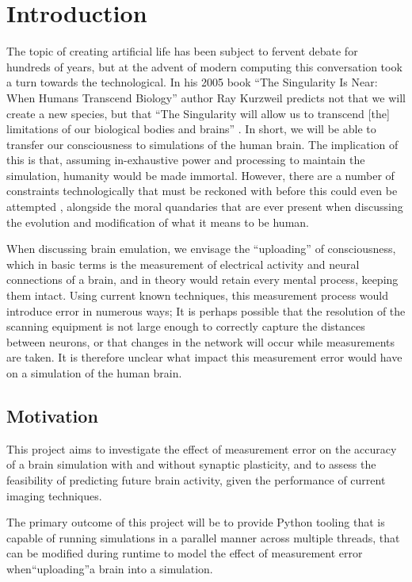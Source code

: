 \chapter{Introduction}

The topic of creating artificial life has been subject to fervent debate for
hundreds of years, but at the advent of modern computing this conversation took
a turn towards the technological. In his 2005 book “The Singularity Is Near:
When Humans Transcend Biology” author Ray Kurzweil predicts not that we will
create a new species, but that “The Singularity will allow us to transcend [the]
limitations of our biological bodies and brains”
\parencite{kurzweil_singularity_2006}.
In short, we will be able to transfer our
consciousness to simulations of the human brain. The implication of this is
that, assuming in-exhaustive power and processing to maintain the simulation,
humanity would be made immortal. However, there are a number of constraints
technologically that must be reckoned with before this could even be attempted
\parencite{bostrom_whole_2008}, alongside the moral quandaries that are ever
present when discussing the evolution and modification of what it means to be
human.

When discussing brain emulation, we envisage the “uploading” of
consciousness, which in basic terms is the measurement of electrical activity
and neural connections of a brain, and in theory would retain every mental
process, keeping them intact. Using current known techniques, this
measurement process would introduce error in numerous ways; It is perhaps
possible that the resolution of the scanning equipment is not large enough to
correctly capture the distances between neurons, or that changes in the network
will occur while measurements are taken. It is therefore unclear what impact
this measurement error would have on a simulation of the human brain.

\section{Motivation}

This project aims to investigate the effect of measurement error on the accuracy
of a brain simulation with and without synaptic plasticity, and to assess the
feasibility of predicting future brain activity, given the performance of
current imaging techniques.

The primary outcome of this project will be to provide Python tooling that is
capable of running simulations in a parallel manner across multiple threads,
that can be modified during runtime to model the effect of measurement error
when“uploading”a brain into a simulation.


